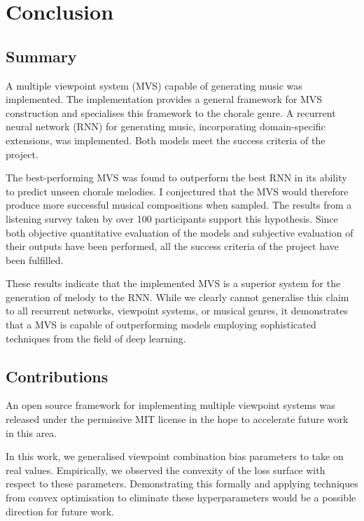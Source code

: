 \documentclass[12pt,a4paper,twoside,openright]{report}
\newcommand{\todo}{\textcolor{red}{\textbf{todo}~}}
\begin{document}
%

\chapter{Conclusion}\label{chap:conc}

\section{Summary}

A multiple viewpoint system (MVS) capable of generating music was implemented.
The implementation provides a general framework for MVS construction and
specialises this framework to the chorale genre. A recurrent neural network
(RNN) for generating music, incorporating domain-specific extensions, was
implemented. Both models meet the success criteria of the project.

The best-performing MVS was found to outperform the best RNN in its ability to
predict unseen chorale melodies. I conjectured that the MVS would therefore
produce more successful musical compositions when sampled. The results from a
listening survey taken by over 100 participants support this hypothesis.  Since
both objective quantitative evaluation of the models and subjective evaluation
of their outputs have been performed, all the success criteria of the project
have been fulfilled. 

These results indicate that the implemented MVS is a superior system for the
generation of melody to the RNN. While we clearly cannot generalise this claim
to all recurrent networks, viewpoint systems, or musical genres, it demonstrates
that a MVS is capable of outperforming models employing sophisticated techniques
from the field of deep learning.

\section{Contributions}

An open source framework for implementing multiple viewpoint systems was
released under the permissive MIT license in the hope to accelerate future work
in this area. 

In this work, we generalised viewpoint combination bias parameters to take on
real values. Empirically, we observed the convexity of the loss surface with
respect to these parameters. Demonstrating this formally and applying techniques
from convex optimisation to eliminate these hyperparameters would be a
possible direction for future work.
\end{document}
